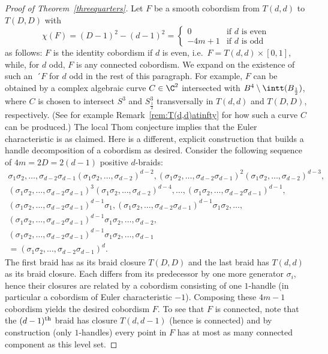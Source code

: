 \begin{proof}[Proof of Theorem~\ref{threequarters}]
Let $F$ be a smooth cobordism from $T(d,d)$ to $T(D,D)$ with
\[
\chi(F)=(D-1)^2-(d-1)^2=
\begin{cases}
0&\text{if $d$ is even}\\
-4m+1&\text{if $d$ is odd}
\end{cases}
\]
as follows: $F$ is the identity cobordism if $d$ is even, i.e.~$F=T(d,d)\times[0,1]$, while, for $d$ odd, $F$ is any connected cobordism. We expand on the existence of such an~´$F$ for $d$ odd in the rest of this paragraph. For example, $F$ can be obtained by a complex algebraic curve $C\in \C^2$ intersected with $B^4\setminus \intt(B_{\frac{1}{2}})$, where $C$ is chosen to intersect $S^3$ and $S^3_{\frac{1}{2}}$ transversally in $T(d,d)$ and $T(D,D)$, respectively. (See for example Remark~\ref{rem:T(d,d)atinfty} for how such a curve $C$ can be produced.) The local Thom conjecture implies that the Euler characteristic is as claimed. Here is a different, explicit construction that builds a handle decomposition of a cobordism as desired. Consider the following sequence of $4m=2D=2(d-1)$ positive $d$-braids:
\begin{align*}
\sigma_1\sigma_2,\dots,\sigma_{d-2}\sigma_{d-1}(\sigma_1\sigma_2,\dots,\sigma_{d-2})^{d-2}, (\sigma_1\sigma_2,\dots,\sigma_{d-2}\sigma_{d-1})^2(\sigma_1\sigma_2,\dots,\sigma_{d-2})^{d-3},\\
(\sigma_1\sigma_2,\dots,\sigma_{d-2}\sigma_{d-1})^3(\sigma_1\sigma_2,\dots,\sigma_{d-2})^{d-4},
\dots,
(\sigma_1\sigma_2,\dots,\sigma_{d-2}\sigma_{d-1})^{d-1},\\ (\sigma_1\sigma_2,\dots,\sigma_{d-2}\sigma_{d-1})^{d-1}\sigma_1,
(\sigma_1\sigma_2,\dots,\sigma_{d-2}\sigma_{d-1})^{d-1}\sigma_1\sigma_2,
\dots,\\
(\sigma_1\sigma_2,\dots,
\sigma_{d-2}\sigma_{d-1})^{d-1}\sigma_1\sigma_2,\dots,
\sigma_{d-2},\\
(\sigma_1\sigma_2,\dots,\sigma_{d-2}\sigma_{d-1})^{d-1}\sigma_1\sigma_2,\dots,
\sigma_{d-1}\\
=(\sigma_1\sigma_2,\dots,\sigma_{d-2}\sigma_{d-1})^{d}.
\end{align*}
The first braid has as its braid closure $T(D,D)$ and the last braid has $T(d,d)$ as its braid closure. Each differs from its predecessor by one more generator $\sigma_i$, hence their closures are related by a cobordism consisting of one $1$-handle (in particular a cobordism of Euler characteristic $-1$). Composing these $4m-1$ cobordism yields the desired cobordism $F$. To see that $F$ is connected, note that the $(d-1)^{\rm th}$ braid has closure $T(d, d-1)$ (hence is connected) and by construction (only $1$-handles) every point in $F$ has at most as many connected component as this level set.


\end{proof}
